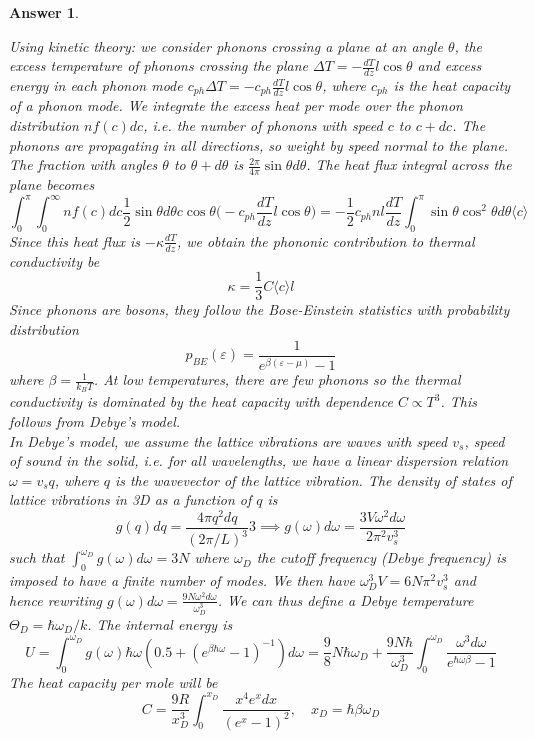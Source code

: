 \documentclass[a4paper]{article}
\newtheorem{ans}{Answer}[subsection]
\theoremstyle{new}
\begin{document}
\begin{ans}
\begin{itemize}
\end{itemize}
Using kinetic theory: we consider phonons crossing a plane at an angle $\theta$, the excess temperature of phonons crossing the plane $\Delta T=-\frac{dT}{dz}l\cos\theta$ and excess energy in each phonon mode $c_{ph}\Delta T=-c_{ph}\frac{dT}{dz}l\cos\theta$, where $c_{ph}$ is the heat capacity of a phonon mode. We integrate the excess heat per mode over the phonon distribution $nf(c)dc$, i.e. the number of phonons with speed $c$ to $c+dc$. The phonons are propagating in all directions, so weight by speed normal to the plane. The fraction with angles $\theta$ to $\theta+d\theta$ is $\frac{2\pi}{4\pi}\sin\theta d\theta$. The heat flux integral across the plane becomes
$$\int_0^\pi\int_0^\infty nf(c)dc\frac{1}{2}\sin\theta d\theta c\cos\theta\bigg(-c_{ph}\frac{dT}{dz}l\cos\theta\bigg)=-\frac{1}{2}c_{ph}nl\frac{dT}{dz}\int_0^\pi\sin\theta\cos^2\theta d\theta\langle c\rangle$$
Since this heat flux is $-\kappa\frac{dT}{dz}$, we obtain the phononic contribution to thermal conductivity be
$$\kappa=\frac{1}{3}C\langle c\rangle l$$
Since phonons are bosons, they follow the Bose-Einstein statistics with probability distribution
$$p_{BE}(\varepsilon)=\frac{1}{e^{\beta(\varepsilon-\mu)}-1}$$
where $\beta=\frac{1}{k_BT}$. At low temperatures, there are few phonons so the thermal conductivity is dominated by the heat capacity with dependence $C\propto T^3$. This follows from Debye's model.\\[5pt]
In Debye's model, we assume the lattice vibrations are waves with speed $v_s$, speed of sound in the solid, i.e. for all wavelengths, we have a linear dispersion relation $\omega=v_sq$, where $q$ is the wavevector of the lattice vibration. The density of states of lattice vibrations in 3D as a function of $q$ is
$$g(q)dq=\frac{4\pi q^2dq}{(2\pi/L)^3}3\implies g(\omega)d\omega=\frac{3V\omega^2d\omega}{2\pi^2v_s^3}$$
such that $\int_0^{\omega_D}g(\omega)d\omega=3N$ where $\omega_D$ the cutoff frequency (Debye frequency) is imposed to have a finite number of modes. We then have $\omega_D^3V=6N\pi^2v_s^3$ and hence rewriting $g(\omega)d\omega=\frac{9N\omega^2d\omega}{\omega_D^3}$. We can thus define a Debye temperature $\Theta_D=\hbar\omega_D/k$. The internal energy is 
$$U=\int_0^{\omega_D}g(\omega)\hbar\omega(0.5+(e^{\beta\hbar\omega}-1)^{-1})d\omega=\frac{9}{8}N\hbar\omega_D+\frac{9N\hbar}{\omega_D^3}\int_0^{\omega_D}\frac{\omega^3d\omega}{e^{\hbar\omega\beta}-1}$$
The heat capacity per mole will be
$$C=\frac{9R}{x_D^3}\int_0^{x_D}\frac{x^4e^xdx}{(e^x-1)^2},\quad x_D=\hbar\beta\omega_D$$

\end{ans}
\end{document}
